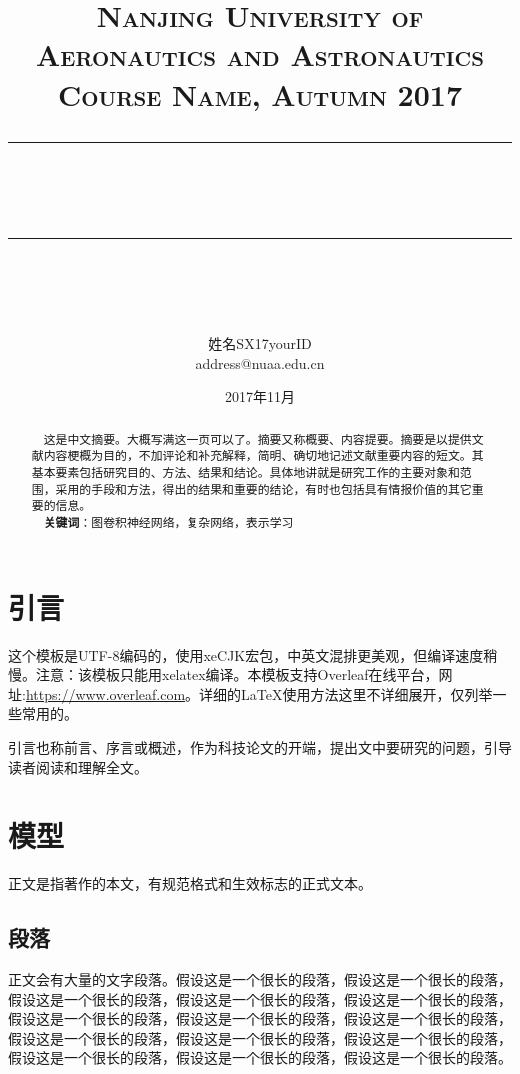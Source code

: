 \documentclass[12pt]{article} %
\newcommand{\horrule}[1]{\rule[0.5ex]{\linewidth}{#1}} 	%
\begin{document}
\title{
{\normalfont\normalsize\textsc{
Nanjing University of Aeronautics and Astronautics\\
Course Name, Autumn 2017 \\[25pt]}}
\horrule{0.5pt}\\
\horrule{1.8pt}\\[20pt]
}
\author{姓名\quad SX17yourID\\address@nuaa.edu.cn}
\date{2017年11月} %

\begin{titlepage}
\maketitle
\vspace{30pt}
\begin{abstract}
\normalsize \ \ 这是中文摘要。大概写满这一页可以了。摘要又称概要、内容提要。摘要是以提供文献内容梗概为目的，不加评论和补充解释，简明、确切地记述文献重要内容的短文。其基本要素包括研究目的、方法、结果和结论。具体地讲就是研究工作的主要对象和范围，采用的手段和方法，得出的结果和重要的结论，有时也包括具有情报价值的其它重要的信息。\\[5pt]
\indent \ \ \textbf{关键词}：图卷积神经网络，复杂网络，表示学习
\end{abstract}
\thispagestyle{empty}
\end{titlepage}

\tableofcontents
\thispagestyle{empty}

\newpage
\setcounter{page}{1}

\section{引言}
这个模板是UTF-8编码的，使用xeCJK宏包，中英文混排更美观，但编译速度稍慢。注意：该模板只能用xelatex编译。本模板支持Overleaf在线\LaTeXe 平台，网址:\url{https://www.overleaf.com}。详细的\LaTeX 使用方法这里不详细展开，仅列举一些常用的。

引言也称前言、序言或概述，作为科技论文的开端，提出文中要研究的问题，引导读者阅读和理解全文。


\section{模型}
正文是指著作的本文，有规范格式和生效标志的正式文本。

\subsection{段落}
正文会有大量的文字段落。假设这是一个很长的段落，假设这是一个很长的段落，假设这是一个很长的段落，假设这是一个很长的段落，假设这是一个很长的段落，假设这是一个很长的段落，假设这是一个很长的段落，假设这是一个很长的段落，假设这是一个很长的段落，假设这是一个很长的段落，假设这是一个很长的段落，假设这是一个很长的段落，假设这是一个很长的段落，假设这是一个很长的段落。
\end{document}

